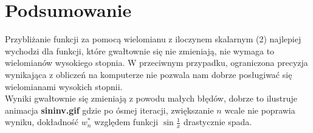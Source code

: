 \documentclass{article}
\begin{document}
\section{Podsumowanie}
Przybliżanie funkcji za pomocą wielomianu z iloczynem skalarnym (2) najlepiej wychodzi dla funkcji, które gwałtownie się nie zmieniają, nie wymaga to wielomianów wysokiego stopnia. W przeciwnym przypadku, ograniczona precyzja wynikająca z obliczeń na komputerze nie pozwala nam dobrze posługiwać się wielomianami wysokich stopnii.\\
Wyniki gwałtownie się zmieniają z powodu małych błędów, dobrze to ilustruje animacja
\textbf{sininv.gif} gdzie po ósmej iteracji, zwiększanie $n$ wcale nie poprawia wyniku, dokładność $w_n^*$ względem funkcji $\sin{\frac{1}{x}}$ drastycznie spada.
\end{document}
